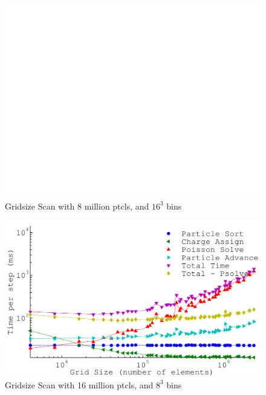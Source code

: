\begin{figure}[h]
\begin{center}
\includegraphics[width=6in]{performance/gridsize_scan8ptcls16bins.pdf}
\end{center}
\caption{Gridsize Scan with 8 million ptcls, and $16^3$ bins}
\label{fig:nptclsize_scan128x64x64}
\end{figure}


\begin{figure}[h]
\begin{center}
\includegraphics[width=6in]{performance/gridsize_scan16ptcls8bins.pdf}
\end{center}
\caption{Gridsize Scan with 16 million ptcls, and $8^3$ bins}
\label{fig:nptclsize_scan128x64x64}
\end{figure}

